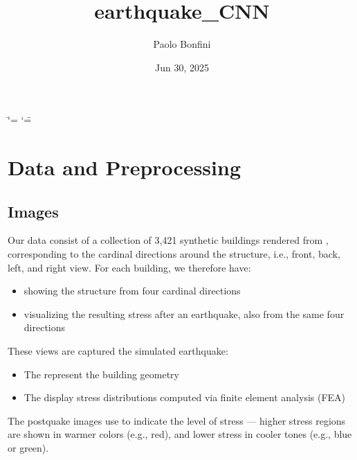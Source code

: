 \documentclass[letterpaper,10pt,english]{sphinxmanual}
\title{earthquake\_CNN}
\date{Jun 30, 2025}
\author{Paolo Bonfini}
\begin{document}
\ifdefined\shorthandoff
  \ifnum\catcode`\=\string=\active\shorthandoff{=}\fi
  \ifnum\catcode`\"=\active{}\fi
\fi

\pagestyle{empty}
\sphinxmaketitle
\pagestyle{plain}
\sphinxtableofcontents
\pagestyle{normal}
\label{\detokenize{index::doc}}


\sphinxstepscope


\chapter{Data and Preprocessing}
\label{\detokenize{data:data-and-preprocessing}}\label{\detokenize{data:data-section}}\label{\detokenize{data::doc}}

\section{Images}
\label{\detokenize{data:images}}
\sphinxAtStartPar
Our data  consist of a collection of 3,421 synthetic buildings
rendered from , corresponding to the cardinal directions
around the structure, i.e., front, back, left, and right view.
For each building, we therefore have:
\begin{itemize}
\item {} 
\sphinxAtStartPar
{} showing the structure from four cardinal directions

\item {} 
\sphinxAtStartPar
{} visualizing the resulting stress after an earthquake, also from the same four directions

\end{itemize}

\sphinxAtStartPar
These views are captured  the simulated earthquake:
\begin{itemize}
\item {} 
\sphinxAtStartPar
The  represent the building geometry

\item {} 
\sphinxAtStartPar
The  display stress distributions computed via finite element analysis (FEA)

\end{itemize}

\sphinxAtStartPar
The post\sphinxhyphen{}quake images use  to indicate the level of
stress — higher stress regions are shown in warmer colors (e.g., red), and
lower stress in cooler tones (e.g., blue or green).
\end{document}
